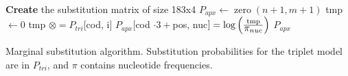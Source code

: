 \begin{algorithm}[!ht]
\begin{algorithmic}[1]
  \State \textbf{Create} the substitution matrix of size 183x4
  \State $P_{apx} \gets \operatorname{zero}(n+1, m+1)$
        \State tmp $\gets 0$
            \State tmp $\otimes= P_{tri}[$cod, i$]$
          \EndIf
        \EndFor
        \State $P_{apx}[$cod $\cdot 3 + $pos, nuc$] = \log \left( \frac{\text{tmp}}{\grande{\pi_{nuc}}} \right)$ 
      \EndFor
    \EndFor
  \EndFor
  \State \Return $P_{apx}$
\EndFunction
\end{algorithmic}
\caption[Marginal Substitution Pseudocode]{Marginal substitution algorithm. Substitution probabilities for the triplet model are in $P_{tri}$, and $\pi$ contains nucleotide frequencies.}\label{alg:marginal-sub}
\end{algorithm}